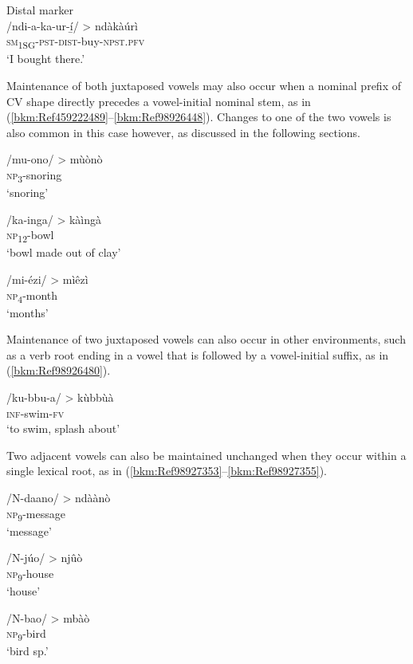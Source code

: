 \ea
Distal marker\\
/ndi-a-ka-ur-í̲/ > ndàkàúrì\\
\textsc{sm}\textsubscript{1SG}-\textsc{pst}-\textsc{dist}-buy-\textsc{npst}.\textsc{pfv}\\
\glt ‘I bought there.’
\z

Maintenance of both juxtaposed vowels may also occur when a nominal pre\-fix of CV shape directly precedes a vowel-initial nominal stem, as in (\ref{bkm:Ref459222489}--\ref{bkm:Ref98926448}). Changes to one of the two vowels is also common in this case however, as discussed in the following sections.

\ea
\label{bkm:Ref459222489}
/mu-ono/ > mùònò\\
\textsc{np}\textsubscript{3}-snoring\\
\glt ‘snoring’
\z

\ea
/ka-inga/ > kàìngà\\
\textsc{np}\textsubscript{12}-bowl\\
\glt ‘bowl made out of clay’
\z

\ea
\label{bkm:Ref98926448}
/mi-ézi/ > mìêzì\\
\textsc{np}\textsubscript{4}-month\\
\glt ‘months’
\z

Maintenance of two juxtaposed vowels can also occur in other environments, such as a verb root ending in a vowel that is followed by a vowel-initial suffix, as in (\ref{bkm:Ref98926480}).

\ea
\label{bkm:Ref98926480}
/ku-bbu-a/ > kùbbùà\\
\textsc{inf}-swim-\textsc{fv}\\
\glt ‘to swim, splash about’
\z

Two adjacent vowels can also be maintained unchanged when they occur within a single lexical root, as in (\ref{bkm:Ref98927353}--\ref{bkm:Ref98927355}).

\ea
\label{bkm:Ref98927353}
/N-daano/ > ndàànò\\
\textsc{np}\textsubscript{9}-message\\
\glt ‘message’
\z

\ea
/N-júo/ > njûò\\
\textsc{np}\textsubscript{9}-house\\
\glt ‘house’
\z

\ea
\label{bkm:Ref98927355}
/N-bao/ > mbàò\\
\textsc{np}\textsubscript{9}-bird\\
\glt ‘bird sp.’
\z

